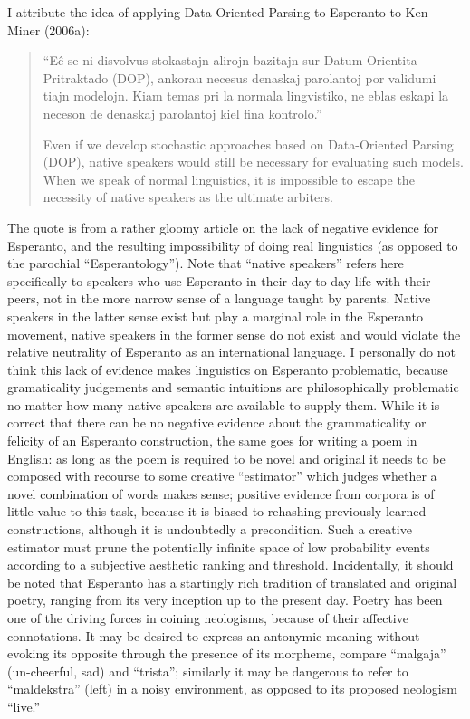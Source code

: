 \documentclass[10pt,a4paper]{article}
\begin{document}
I attribute the idea of applying Data-Oriented Parsing to Esperanto to
Ken Miner (2006a):

\begin{quote}
	``E\^c se ni disvolvus stokastajn alirojn bazitajn sur Datum-Orientita
	Pritraktado (DOP), ankorau necesus denaskaj parolantoj por validumi
	tiajn modelojn. Kiam temas pri la normala lingvistiko, ne eblas eskapi
	la neceson de denaskaj parolantoj kiel fina kontrolo.''

	Even if we develop stochastic approaches based on Data-Oriented
	Parsing (DOP), native speakers would still be necessary for evaluating
	such models. When we speak of normal linguistics, it is impossible
	to escape the necessity of native speakers as the ultimate arbiters.
\end{quote}

The quote is from a rather gloomy article on the lack of negative evidence
for Esperanto, and the resulting impossibility of doing real linguistics (as
opposed to the parochial ``Esperantology''). Note that ``native speakers''
refers here specifically to speakers who use Esperanto in their day-to-day
life with their peers, not in the more narrow sense of a language taught by
parents. Native speakers in the latter sense exist but play a marginal role in
the Esperanto movement, native speakers in the former sense do not exist and
would violate the relative neutrality of Esperanto as an international
language. I personally do not think this lack of evidence makes linguistics on
Esperanto problematic, because gramaticality judgements and semantic
intuitions are philosophically problematic no matter how many native speakers
are available to supply them. While it is correct that there can be no
negative evidence about the grammaticality or felicity of an Esperanto
construction, the same goes for writing a poem in English: as long as the poem
is required to be novel and original it needs to be composed with recourse to
some creative ``estimator'' which judges whether a novel combination of words
makes sense; positive evidence from corpora is of little value to this task,
because it is biased to rehashing previously learned constructions, although
it is undoubtedly a precondition.  Such a creative estimator must prune the
potentially infinite space of low probability events according to a subjective
aesthetic ranking and threshold. Incidentally, it should be noted that
Esperanto has a startingly rich tradition of translated and original poetry,
ranging from its very inception up to the present day.  Poetry has been one
of the driving forces in coining neologisms, because of their affective
connotations. It may be desired to express an antonymic meaning without
evoking its opposite through the presence of its morpheme, compare ``malgaja''
(un-cheerful, sad) and ``trista''; similarly it may be dangerous to refer to
``maldekstra'' (left) in a noisy environment, as opposed to its proposed
neologism ``live.''
\end{document}
